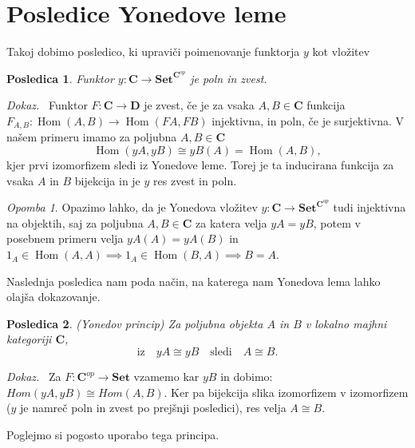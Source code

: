 \documentclass[12pt,a4paper]{book}
\theoremstyle{definition}
\theoremstyle{plain}
\newtheorem{posledica}{Posledica}[definicija]
\newenvironment{dokaz}{\emph{Dokaz.}\ }{\hspace{\fill}{$\Box$}}
\theoremstyle{definition}
\theoremstyle{remark}
\newtheorem*{opomba}{Opomba}
\newcommand{\cat}[1]{\textbf{#1}}
\DeclareMathOperator{\Hom}{Hom}
\begin{document}
\section[Posledice]{Posledice Yonedove leme}

Takoj dobimo posledico, ki upraviči poimenovanje funktorja $y$ kot vložitev
\begin{posledica} Funktor $y : \cat{C} \to \cat{Set}^{\cat{C}^{op}}$ je poln in zvest.
\end{posledica}
\begin{dokaz}
Funktor $F:\cat{C} \to \cat{D}$ je zvest, če je za vsaka $A,B \in \cat{C}$ funkcija $F_{A,B} : \Hom(A,B) \to \Hom(FA,FB)$ injektivna, in poln, če je surjektivna.
V našem primeru imamo za poljubna $A,B \in \cat{C}$ 
$$\Hom(yA,yB) \cong yB(A) = \Hom(A,B),$$
kjer prvi izomorfizem sledi iz Yonedove leme. Torej je ta inducirana funkcija za vsaka $A$ in $B$ bijekcija in je $y$ res zvest in poln.
\end{dokaz}
\begin{opomba}
Opazimo lahko, da je Yonedova vložitev $y : \cat{C} \to \cat{Set}^{\cat{C}^{op}}$ tudi injektivna na objektih, saj za poljubna $A,B \in \cat{C}$ za katera velja $yA = yB$, potem v posebnem primeru velja $yA(A) = yA(B)$ in $1_A \in \Hom(A,A) \implies 1_A \in \Hom(B,A) \implies B = A$.
\end{opomba}

Naslednja posledica nam poda način, na katerega nam Yonedova lema lahko olajša dokazovanje.

\begin{posledica} \emph{(Yonedov princip)}
Za poljubna objekta $A$ in $B$ v lokalno majhni kategoriji $\cat{C}$,
$$\text{iz} \quad yA \cong yB \quad\text{sledi}\quad A \cong B .$$
\end{posledica}
\begin{dokaz}
Za $F : \cat{C}^{op} \to \cat{Set}$ vzamemo kar $yB$ in dobimo: $Hom(yA,yB) \cong Hom(A,B)$. Ker pa bijekcija slika izomorfizem v izomorfizem ($y$ je namreč poln in zvest po prejšnji posledici), res velja $A \cong B$.
\end{dokaz}


Poglejmo si pogosto uporabo tega principa.
\end{document}
